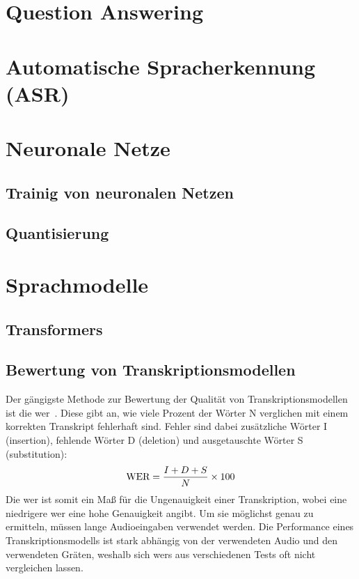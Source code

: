 
\section{Question Answering}

\section{Automatische Spracherkennung (ASR)}

\section{Neuronale Netze}
\subsection{Trainig von neuronalen Netzen}
\subsection{Quantisierung}

\section{Sprachmodelle}
\subsection{Transformers}
\subsection{Bewertung von Transkriptionsmodellen}
Der gängigste Methode zur Bewertung der Qualität von Transkriptionsmodellen ist die \ac{wer}~\citep{wer}.
Diese gibt an, wie viele Prozent der Wörter N verglichen mit einem korrekten Transkript fehlerhaft sind.
Fehler sind dabei zusätzliche Wörter I (insertion), fehlende Wörter D (deletion) und ausgetauschte Wörter S (substitution):
\[\textnormal{WER} = \frac{I + D + S}{N} \times 100\]
Die \ac{wer} ist somit ein Maß für die Ungenauigkeit einer Transkription, wobei eine niedrigere \ac{wer} eine hohe Genauigkeit angibt.
Um sie möglichst genau zu ermitteln, müssen lange Audioeingaben verwendet werden.
Die Performance eines Transkriptionsmodells ist stark abhängig von der verwendeten Audio und den verwendeten Gräten, weshalb sich \acp{wer} aus verschiedenen Tests oft nicht vergleichen lassen.

